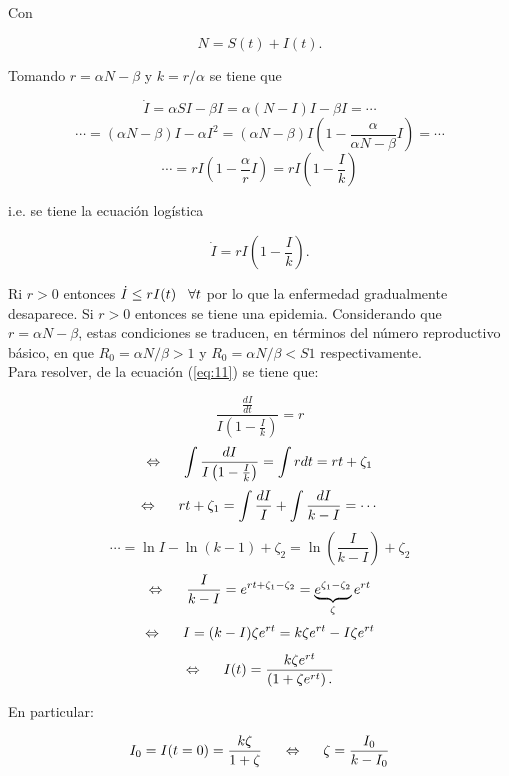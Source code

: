 \documentclass[10pt,oneside]{article}
\begin{document}
\begin{multicols}{2}
    Con
    
    \begin{equation}\label{eq:10}
        N=S(t)+I(t).
    \end{equation}
    
    Tomando $r=\alpha N-\beta$ y $ k=r/\alpha$ se tiene que 
    
    $$\dot I=\alpha SI-\beta I=\alpha (N-I)I-\beta I=\cdots $$ 
    $$\cdots=(\alpha N-\beta)I-\alpha I^2=(\alpha N-\beta)I\left(1-\frac{\alpha}{\alpha N-\beta}I\right)=\cdots$$
    $$\cdots=rI\left(1-\frac{\alpha}{r}I\right)=rI\left(1-\frac{I}{k}\right)$$
    
    i.e. se tiene la ecuación logística
    
    \begin{equation}\label{eq:11}
        \dot I=rI\left(1-\frac{I}{k}\right).
    \end{equation}
    
    Ri $r>0$ entonces $\dot I\leq rI(t) \hspace{0.3cm}\forall t$ por lo que la enfermedad gradualmente desaparece. Si $r>0$ entonces se tiene una epidemia. Considerando que $r=\alpha N-\beta$, estas condiciones se traducen, en términos del número reproductivo básico, en que $R_0=\alpha N/\beta>1$ y  $R_0=\alpha N/\beta<S1$ respectivamente.\\ \newline Para resolver, de la ecuación (\ref{eq:11}) se tiene que:
    
    $$\frac{\frac{dI}{dt}}{I\left(1-\frac{I}{k}\right)}=r$$
    $$\Leftrightarrow \hspace{0.5cm} \int \frac{dI}{I\left(1-\frac{I}{k}\right)}=\int r dt=rt+\zeta_1$$
    $$\Leftrightarrow \hspace{0.5cm} rt+\zeta_1=\int\frac{dI}{I}+\int\frac{dI}{k-I}=\cdots$$ $$\cdots=\ln I- \ln(k-1) + \zeta_2=\ln\left(\frac{I}{k-I}\right)+\zeta_2$$    
    $$\Leftrightarrow \hspace{0.5cm} \frac{I}{k-I}=e^{rt+\zeta_1-\zeta_2}=\underbrace{e^{\zeta_1-\zeta_2}}_{\zeta}e^{rt}$$
    $$\Leftrightarrow \hspace{0.5cm}I=(k-I)\zeta e^{rt}=k\zeta e^{rt}-I\zeta e^{rt}$$  $$\Leftrightarrow \hspace{0.5cm}I(t)=\frac{k \zeta e^{rt}}{\left(1+\zeta e^{rt}\right).}$$
    
   En particular:
   
   $$I_0=I(t=0)=\frac{k\zeta}{1+\zeta}\hspace{0.5cm}\Leftrightarrow\hspace{0.5cm} \zeta=\frac{I_0}{k-I_0}$$
   

\end{multicols}
\end{document}
